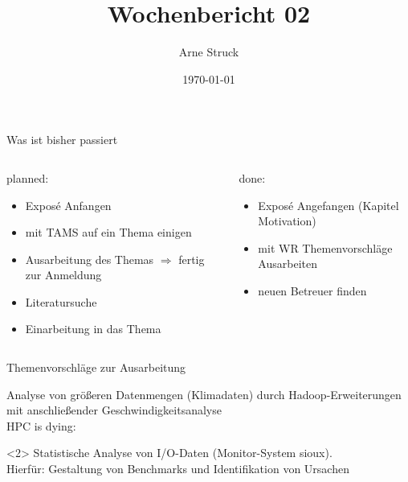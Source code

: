 \documentclass{beamer}
\title{Wochenbericht 02}
\subtitle{}
\author{Arne Struck}
\institute{Universität Hamburg, Fachschaft Informatik, Abschlussarbeitenseminar}
\date{\today}
\begin{document}
\begin{frame}
\maketitle
\end{frame}

\begin{frame}{Was ist bisher passiert}
\begin{columns}[t]
    \begin{column}{.5\textwidth}      	
      	\begin{block}{planned:}
        	\begin{itemize}
	        	\item Exposé Anfangen
        		\item mit TAMS auf ein Thema einigen
        		\item Ausarbeitung des Themas \(\Rightarrow\) fertig zur Anmeldung
        		\item Literatursuche
        		\item Einarbeitung in das Thema
        	\end{itemize}
    	\end{block}
    \end{column}
	\begin{column}{.5\textwidth}
		\uncover<2> {
		\begin{block}{done:}
        	\begin{itemize}
        		\item Exposé Angefangen (Kapitel Motivation)
	        	\item mit WR Themenvorschläge Ausarbeiten
    	    	\item neuen Betreuer finden
        	\end{itemize}
		\end{block}
		}
	\end{column}
\end{columns}
\end{frame}

\begin{frame}{Themenvorschläge zur Ausarbeitung}
\begin{block}{}
	Analyse von größeren Datenmengen (Klimadaten) durch Hadoop-Erweiterungen mit anschließender Geschwindigkeitsanalyse \\
	HPC is dying: \cite{hpcDies}
\end{block}
\begin{block}<2>{}
	Statistische Analyse von I/O-Daten (Monitor-System sioux). \\
	Hierfür: Gestaltung von Benchmarks und Identifikation von Ursachen
\end{block}
\end{frame}
\end{document}
